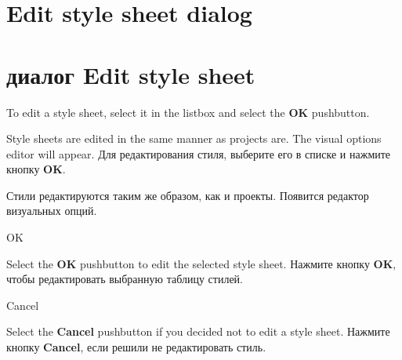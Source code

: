 \ifenglish
\section{Edit style sheet dialog}
\else
\section{диалог Edit style sheet}
\fi
{}

\ifenglish
To edit a style sheet, select it in the
listbox and select the {\bf OK} pushbutton.

Style sheets are edited in the same manner as projects are. The visual options
editor will appear.
\else
Для редактирования стиля, выберите его в списке
и нажмите кнопку {\bf OK}.

Стили редактируются таким же образом, как и проекты. Появится редактор
визуальных опций.
\fi

\begin{popup}
\caption{OK}

\ifenglish
Select the {\bf OK} pushbutton to edit the selected style sheet.
\else
Нажмите кнопку {\bf OK}, чтобы редактировать выбранную таблицу стилей.
\fi
\end{popup}

\begin{popup}
\caption{Cancel}

\ifenglish
Select the {\bf Cancel} pushbutton if you decided not to edit a style
sheet.
\else
Нажмите кнопку {\bf Cancel}, если решили не редактировать стиль.
\fi
\end{popup}

